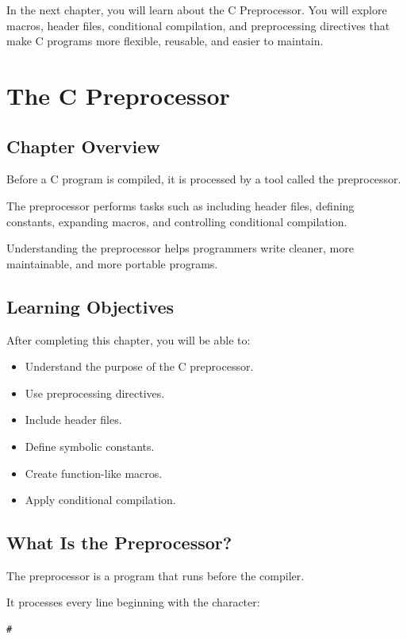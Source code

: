 \documentclass[12pt,openany]{book}
\begin{document}
In the next chapter, you will learn about the C Preprocessor. You will explore macros, header files, conditional compilation, and preprocessing directives that make C programs more flexible, reusable, and easier to maintain.
\chapter{The C Preprocessor}

\section{Chapter Overview}

Before a C program is compiled, it is processed by a tool called the preprocessor.

The preprocessor performs tasks such as including header files, defining constants, expanding macros, and controlling conditional compilation.

Understanding the preprocessor helps programmers write cleaner, more maintainable, and more portable programs.

\section{Learning Objectives}

After completing this chapter, you will be able to:

\begin{itemize}
    \item Understand the purpose of the C preprocessor.
    \item Use preprocessing directives.
    \item Include header files.
    \item Define symbolic constants.
    \item Create function-like macros.
    \item Apply conditional compilation.
\end{itemize}

\section{What Is the Preprocessor?}

The preprocessor is a program that runs before the compiler.

It processes every line beginning with the character:

\begin{lstlisting}
#
\end{lstlisting}
\end{document}
